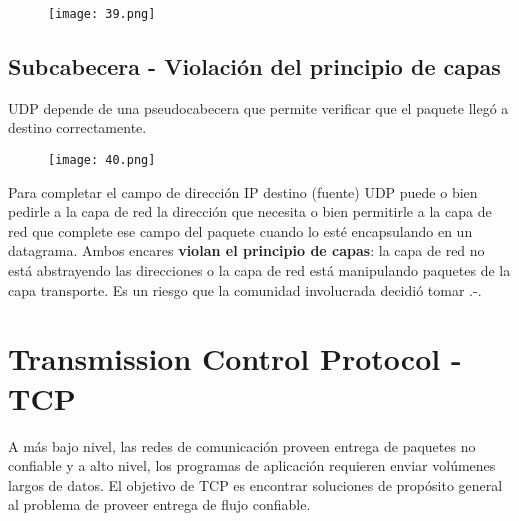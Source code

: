 \documentclass{book}
\begin{document}
	\begin{figure}[H]
		\centering
		\texttt{[image: 39.png]}
	\end{figure}
	
	\subsection{Subcabecera - Violación del principio de capas}
	UDP depende de una pseudocabecera que permite verificar que el paquete llegó a destino correctamente.
	
	\begin{figure}[H]
		\centering
		\texttt{[image: 40.png]}
	\end{figure}
	
	Para completar el campo de dirección IP destino (fuente) UDP puede o bien pedirle a la capa de red la dirección que necesita o bien permitirle a la capa de red que complete ese campo del paquete cuando lo esté encapsulando en un datagrama. Ambos encares \textbf{violan el principio de capas}: la capa de red no está abstrayendo las direcciones o la capa de red está manipulando paquetes de la capa transporte. Es un riesgo que la comunidad involucrada decidió tomar .-.
	
	\pagebreak
	\section{Transmission Control Protocol - TCP}
	A más bajo nivel, las redes de comunicación proveen entrega de paquetes no confiable y a alto nivel, los programas de aplicación requieren enviar volúmenes largos de datos. El objetivo de TCP es encontrar soluciones de propósito general al problema de proveer entrega de flujo confiable.
	
\end{document}
